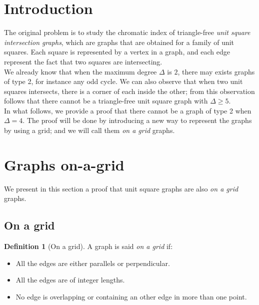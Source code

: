 \documentclass[12pt]{article}
\theoremstyle{definition}
\newtheorem{definition}{Definition}[section]
\theoremstyle{remark}
\begin{document}
\section{Introduction}
The original problem is to study the chromatic index of triangle-free \textit{unit square intersection graphs},
which are graphs that are obtained for a family of unit squares. 
Each square is represented by a vertex in a graph, and each edge represent the fact that two squares are intersecting. \\
We already know that when the maximum degree $\Delta$ is $2$, there may exists graphs of type 2, for instance any odd cycle. We can also observe that
when two unit squares intersects, there is a corner of each inside the other; from this observation follows that there cannot be 
a triangle-free unit square graph with $\Delta \ge 5$. \\
In what follows, we provide a proof that there cannot be a graph of type 2 when $\Delta = 4$. The proof will be done by introducing a new way to
represent the graphs by using a grid; and we will call them \textit{on a grid} graphs.

\section{Graphs on-a-grid}
We present in this section a proof that unit square graphs are also \textit{on a grid} graphs. 
\subsection{On a grid}
\begin{definition}[On a grid]
    A graph is said \textit{on a grid} if:
    \begin{itemize}
        \item All the edges are either parallels or perpendicular.
        \item All the edges are of integer lengths.
        \item No edge is overlapping or containing an other edge in more than one point.
    \end{itemize}
\end{definition}
\end{document}
